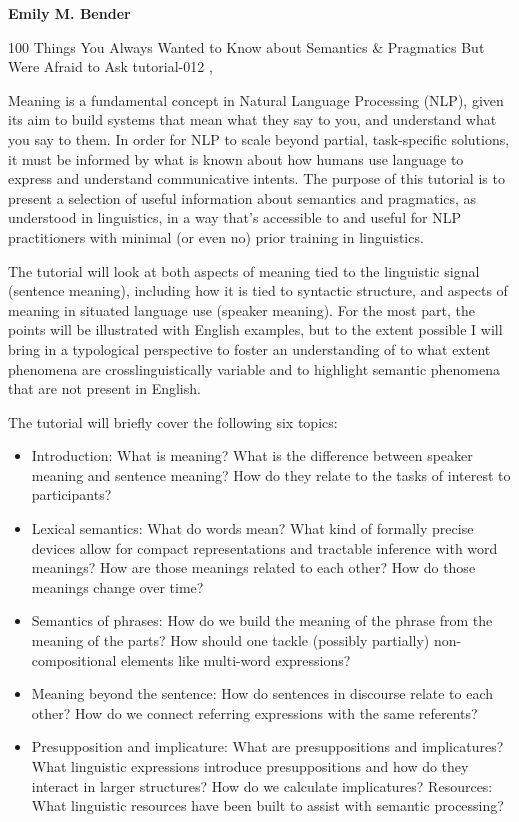 \begin{bio}
  {\bfseries Emily M. Bender} 
  
\end{bio}

\begin{tutorial}
  {100 Things You Always Wanted to Know about Semantics \& Pragmatics But Were Afraid to Ask}
  {tutorial-012}
  {\daydateyear, \tutorialmorningtime}
  {\TutLocA}


Meaning is a fundamental concept in Natural Language Processing (NLP), given its aim to build systems that mean what they say to you, and understand what you say to them. In order for NLP to scale beyond partial, task-specific solutions, it must be informed by what is known about how humans use language to express and understand communicative intents. The purpose of this tutorial is to present a selection of useful information about semantics and pragmatics, as understood in linguistics, in a way that’s accessible to and useful for NLP practitioners with minimal (or even no) prior training in linguistics.

The tutorial will look at both aspects of meaning tied to the linguistic signal (sentence meaning), including how it is tied to syntactic structure, and aspects of meaning in situated language use (speaker meaning). For the most part, the points will be illustrated with English examples, but to the extent possible I will bring in a typological perspective to foster an understanding of to what extent phenomena are crosslinguistically variable and to highlight semantic phenomena that are not present in English.

The tutorial will briefly cover the following six topics:
\begin{itemize}
    \item Introduction: What is meaning? What is the difference between speaker meaning and sentence meaning? How do they relate to the tasks of interest to participants?
    \item Lexical semantics: What do words mean? What kind of formally precise devices allow for compact representations and tractable inference with word meanings? How are those meanings related to each other? How do those meanings change over time?
    \item Semantics of phrases: How do we build the meaning of the phrase from the meaning of the parts? How should one tackle (possibly partially) non-compositional elements like multi-word expressions?
    \item Meaning beyond the sentence: How do sentences in discourse relate to each other? How do we connect referring expressions with the same referents?
    \item Presupposition and implicature: What are presuppositions and implicatures? What linguistic expressions introduce presuppositions and how do they interact in larger structures? How do we calculate implicatures?
Resources: What linguistic resources have been built to assist with semantic processing?
\end{itemize}


\end{tutorial}
